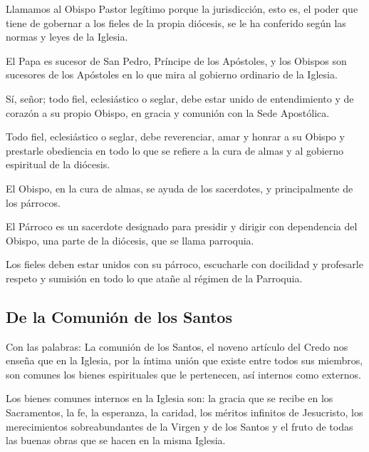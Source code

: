  Llamamos al Obispo
Pastor legítimo porque la jurisdicción, esto es, el poder que tiene de gobernar a los fieles de la propia diócesis, se le ha conferido según las normas y leyes de la
Iglesia.

 El Papa es sucesor
de San Pedro, Príncipe de los Apóstoles, y los Obispos son sucesores de los
Apóstoles en lo que mira al gobierno ordinario de la Iglesia.

 Sí, señor; todo fiel,
eclesiástico o seglar, debe estar unido de entendimiento y de corazón a su propio
Obispo, en gracia y comunión con la Sede Apostólica.

 Todo fiel,
eclesiástico o seglar, debe reverenciar, amar y honrar a su Obispo y prestarle
obediencia en todo lo que se refiere a la cura de almas y al gobierno espiritual de
la diócesis.

 El Obispo, en la
cura de almas, se ayuda de los sacerdotes, y principalmente de los párrocos.

 El Párroco es un sacerdote designado para presidir
y dirigir con dependencia del Obispo, una parte de la diócesis, que se llama
parroquia.

 Los fieles
deben estar unidos con su párroco, escucharle con docilidad y profesarle respeto y
sumisión en todo lo que atañe al régimen de la Parroquia.

\subsection{De la Comunión de los Santos}

 Con las palabras: La comunión de los
Santos, el noveno artículo del Credo nos enseña que en la Iglesia, por la íntima
unión que existe entre todos sus miembros, son comunes los bienes espirituales
que le pertenecen, así internos como externos.

 Los bienes
comunes internos en la Iglesia son: la gracia que se recibe en los Sacramentos, la
fe, la esperanza, la caridad, los méritos infinitos de Jesucristo, los merecimientos
sobreabundantes de la Virgen y de los Santos y el fruto de todas las buenas obras
que se hacen en la misma Iglesia.

